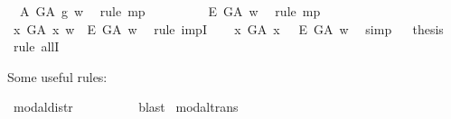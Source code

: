 \begin{isabellebody}
\ {}{\isacharcolon}\ {\isachardoublequoteopen}{\isasymE}\isactrlsup A\ G\isactrlsup A\ g\ w{\isachardoublequoteclose}\ \isamarkupfalse%
\ {\isacharparenleft}rule\ mp{\isacharparenright}\isanewline
\ \ \ \ \isamarkupfalse%
\ {}\ {}\ \isamarkupfalse%
\ {\isachardoublequoteopen}{\isacharparenleft}\isactrlbold {\isasymbox}\isactrlbold {\isasymexists}\isactrlsup E\ G\isactrlsup A{\isacharparenright}\ w{\isachardoublequoteclose}\ \isamarkupfalse%
\ {\isacharparenleft}rule\ mp{\isacharparenright}\isanewline
\ \ \isacommand{{\isacharbraceright}}\isamarkupfalse%
\isanewline
\ \ \isamarkupfalse%
\ {\isachardoublequoteopen}{\isacharparenleft}{\isasymexists}x{\isachardot}\ G\isactrlsup A\ x\ w{\isacharparenright}\ {\isasymlongrightarrow}\ {\isacharparenleft}\isactrlbold {\isasymbox}\isactrlbold {\isasymexists}\isactrlsup E\ G\isactrlsup A{\isacharparenright}\ w{\isachardoublequoteclose}\ \isamarkupfalse%
\ {\isacharparenleft}rule\ impI{\isacharparenright}\isanewline
\ \ \isamarkupfalse%
\ {\isachardoublequoteopen}{\isacharparenleft}{\isacharparenleft}\isactrlbold {\isasymexists}x{\isachardot}\ G\isactrlsup A\ x{\isacharparenright}\ \isactrlbold {\isasymrightarrow}\ \ \isactrlbold {\isasymbox}\isactrlbold {\isasymexists}\isactrlsup E\ G\isactrlsup A{\isacharparenright}\ w{\isachardoublequoteclose}\ \isamarkupfalse%
\ simp\isanewline
\isacommand{{\isacharbraceright}}\isamarkupfalse%
\isanewline
\ \isamarkupfalse%
\ {\isacharquery}thesis\ \isamarkupfalse%
\ {\isacharparenleft}rule\ allI{\isacharparenright}\ \isanewline
{}\isamarkupfalse%
%
%
%
%
\begin{isamarkuptext}%
Some useful rules:%
\end{isamarkuptext}\isamarkuptrue%
\isamarkupfalse%
\ modal{\isacharunderscore}distr{\isacharcolon}\ {\isachardoublequoteopen}{\isasymlfloor}\isactrlbold {\isasymbox}{\isacharparenleft}{\isasymphi}\ \isactrlbold {\isasymrightarrow}\ {\isasympsi}{\isacharparenright}{\isasymrfloor}\ {\isasymLongrightarrow}\ {\isasymlfloor}{\isacharparenleft}\isactrlbold {\isasymdiamond}{\isasymphi}\ \isactrlbold {\isasymrightarrow}\ \isactrlbold {\isasymdiamond}{\isasympsi}{\isacharparenright}{\isasymrfloor}{\isachardoublequoteclose}%
\ %
%
\isamarkupfalse%
\ blast%
%
%
\isanewline
{}\isamarkupfalse%
\ modal{\isacharunderscore}trans{\isacharcolon}\ {\isachardoublequoteopen}{\isacharparenleft}{\isasymlfloor}{\isasymphi}\ \isactrlbold {\isasymrightarrow}\ {\isasympsi}{\isasymrfloor}\ {\isasymand}\ {\isasymlfloor}{\isasympsi}\ \isactrlbold {\isasymrightarrow}\ {\isasymchi}{\isasymrfloor}{\isacharparenright}\ {\isasymLongrightarrow}\ {\isasymlfloor}{\isasymphi}\ \isactrlbold {\isasymrightarrow}\ {\isasymchi}{\isasymrfloor}{\isachardoublequoteclose}%

\end{isabellebody}
